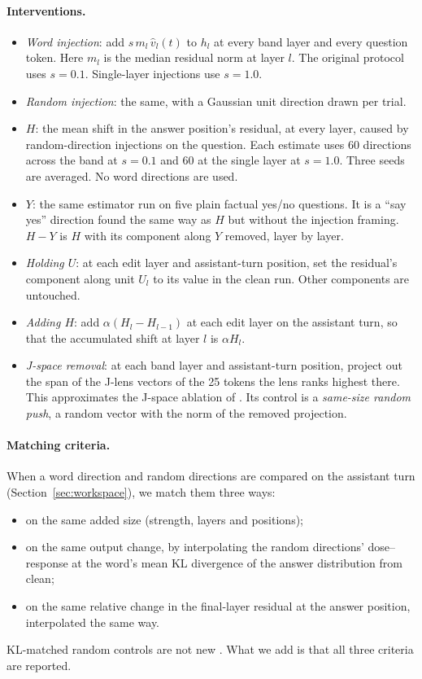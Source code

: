 \documentclass[11pt]{article}
\begin{document}
\paragraph{Interventions.}
\begin{itemize}[leftmargin=*]
  \item \emph{Word injection}: add $s\,m_l\,\hat v_l(t)$ to $h_l$ at every band layer and every question token. Here $m_l$ is the median residual norm at layer $l$. The original protocol uses $s=0.1$. Single-layer injections use $s=1.0$.
  \item \emph{Random injection}: the same, with a Gaussian unit direction drawn per trial.
  \item \emph{$H$}: the mean shift in the answer position's residual, at every layer, caused by random-direction injections on the question. Each estimate uses 60 directions across the band at $s=0.1$ and 60 at the single layer at $s=1.0$. Three seeds are averaged. No word directions are used.
  \item \emph{$Y$}: the same estimator run on five plain factual yes/no questions. It is a ``say yes'' direction found the same way as $H$ but without the injection framing. $H-Y$ is $H$ with its component along $Y$ removed, layer by layer.
  \item \emph{Holding $U$}: at each edit layer and assistant-turn position, set the residual's component along unit $U_l$ to its value in the clean run. Other components are untouched.
  \item \emph{Adding $H$}: add $\alpha(H_l-H_{l-1})$ at each edit layer on the assistant turn, so that the accumulated shift at layer $l$ is $\alpha H_l$.
  \item \emph{J-space removal}: at each band layer and assistant-turn position, project out the span of the J-lens vectors of the 25 tokens the lens ranks highest there. This approximates the J-space ablation of \citet{gurnee2026workspace}. Its control is a \emph{same-size random push}, a random vector with the norm of the removed projection.
\end{itemize}

\paragraph{Matching criteria.} When a word direction and random directions are compared on the assistant turn (Section~\ref{sec:workspace}), we match them three ways:
\begin{itemize}
  \item on the same added size (strength, layers and positions);
  \item on the same output change, by interpolating the random directions' dose--response at the word's mean KL divergence of the answer distribution from clean;
  \item on the same relative change in the final-layer residual at the answer position, interpolated the same way.
\end{itemize}
KL-matched random controls are not new \citep{luo2026steercheck,ferrara2026owmi}. What we add is that all three criteria are reported.
\end{document}
